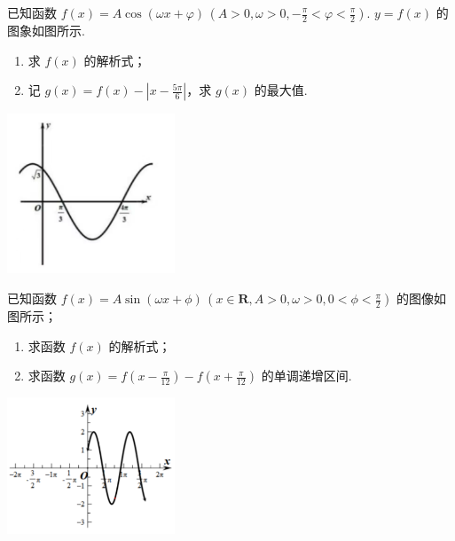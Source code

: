 \documentclass[a4paper , final]{ctexart}
\newenvironment{problemwithfig}[3][2cm]{%
  \item #2
  \par\noindent
  \begin{minipage}[t][8cm][b]{\linewidth}
    \vfill
    \hfill #3
    \par\vspace{#1} %
  \end{minipage}
}{}
\begin{document}
\begin{problems}
  \begin{problemwithfig}[5cm]
    {
      已知函数 $f(x) = A\cos(\omega x + \varphi)\,(A > 0, \omega > 0, -\frac{\pi}{2} < \varphi < \frac{\pi}{2})$. $y = f(x)$ 的图象如图所示.
      \begin{enumerate}[label=(\arabic*)]
        \item 求 $f(x)$ 的解析式；
        \item 记 $g(x) = f(x) - \left|x - \frac{5\pi}{6}\right|$，求 $g(x)$ 的最大值.
      \end{enumerate}
    }
    {
      \includegraphics[width=5cm]{Snipaste_2025-07-22_23-32-36.png}
    }
  \end{problemwithfig}

  \begin{problemwithfig}[5cm]
    {
      已知函数 $f(x) = A\sin(\omega x + \phi)\,(x \in \mathbf{R}, A > 0, \omega > 0, 0 < \phi < \frac{\pi}{2})$ 的图像如图所示；
      \begin{enumerate}[label=(\arabic*)]
        \item 求函数 $f(x)$ 的解析式；
        \item 求函数 $g(x) = f\left(x - \frac{\pi}{12}\right) - f\left(x + \frac{\pi}{12}\right)$ 的单调递增区间.
      \end{enumerate}
    }
    {
      \includegraphics[width=5cm]{Snipaste_2025-07-22_23-35-46.png}
    }
  \end{problemwithfig}


\end{problems}
\end{document}
